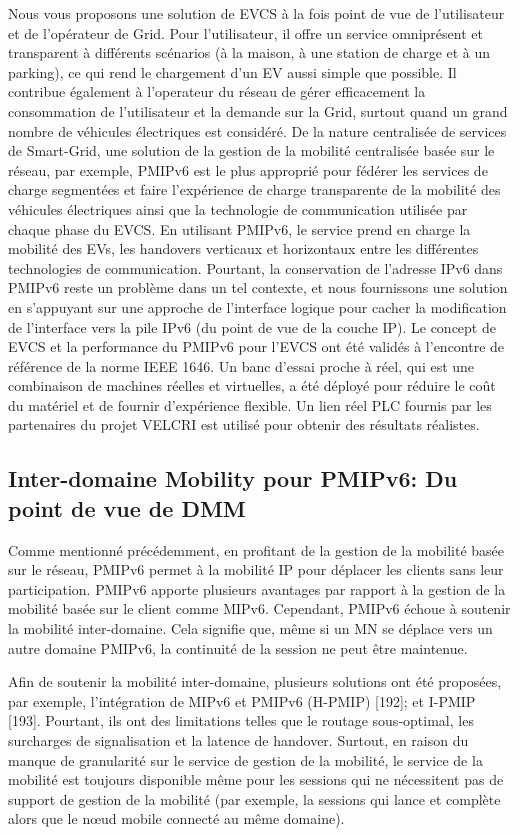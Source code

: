 Nous vous proposons une solution de EVCS à la fois point de vue de l'utilisateur et de l'opérateur de Grid. Pour l'utilisateur, il offre un service omniprésent et  transparent à différents scénarios (à la maison, à une station de charge et à un parking), ce qui rend le chargement d'un EV aussi simple que possible. Il contribue également à l'operateur du réseau de gérer efficacement la consommation de l'utilisateur et la demande sur la Grid, surtout quand un grand nombre de véhicules électriques est considéré. De la nature centralisée de services de Smart-Grid, une solution de la gestion de la mobilité centralisée basée sur le réseau, par exemple, PMIPv6 est le plus approprié pour fédérer les services de charge segmentées et faire l'expérience de charge transparente de la mobilité des véhicules électriques ainsi que la technologie de communication utilisée par chaque phase du EVCS. En utilisant PMIPv6, le service prend en charge la mobilité des EVs, les handovers verticaux et horizontaux entre les différentes technologies de communication. Pourtant, la conservation de l'adresse IPv6 dans PMIPv6 reste un problème dans un tel contexte, et nous fournissons une solution en s'appuyant sur une approche de l'interface logique pour cacher la modification de l'interface vers la pile IPv6 (du point de vue de la couche IP). Le concept de EVCS et la performance du PMIPv6 pour l'EVCS ont été validés à l'encontre de référence de la norme IEEE 1646. Un banc d'essai proche à réel, qui est une combinaison de machines réelles et virtuelles, a été déployé pour réduire le coût du matériel et de fournir d'expérience flexible. Un lien réel PLC fournis par les partenaires du projet VELCRI est utilisé pour obtenir des résultats réalistes.

\subsection{Inter-domaine Mobility pour PMIPv6: Du point de vue de DMM}
Comme mentionné précédemment, en profitant de la gestion de la mobilité basée sur le réseau, PMIPv6 permet à la mobilité IP pour déplacer les clients sans leur participation. PMIPv6 apporte plusieurs avantages par rapport à la gestion de la mobilité basée sur le client comme MIPv6. Cependant, PMIPv6 échoue à soutenir la mobilité inter-domaine. Cela signifie que, même si un MN se déplace vers un autre domaine PMIPv6, la continuité de la session ne peut être maintenue.

Afin de soutenir la mobilité inter-domaine, plusieurs solutions ont été proposées, par exemple, l'intégration de MIPv6 et  PMIPv6 (H-PMIP) [192]; et  I-PMIP [193]. Pourtant, ils ont des limitations telles que le routage sous-optimal, les surcharges de signalisation et la latence de handover. Surtout, en raison du manque de granularité sur le service de gestion de la mobilité, le service de la mobilité est toujours disponible même pour les sessions qui ne nécessitent pas de support de gestion de la mobilité (par exemple, la sessions qui lance et complète alors que le nœud mobile connecté au même domaine).

